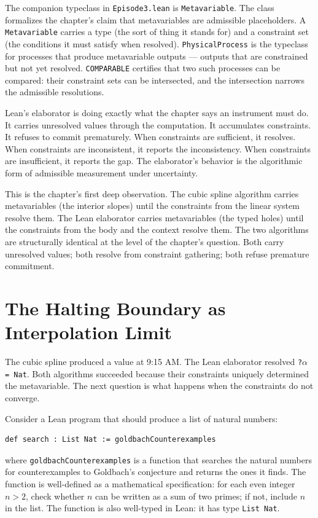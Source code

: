 The companion typeclass in \texttt{Episode3.lean} is
\texttt{Metavariable}. The class formalizes the chapter's claim that
metavariables are admissible placeholders. A \texttt{Metavariable}
carries a type (the sort of thing it stands for) and a constraint set
(the conditions it must satisfy when resolved). \texttt{PhysicalProcess}
is the typeclass for processes that produce metavariable outputs ---
outputs that are constrained but not yet resolved. \texttt{COMPARABLE}
certifies that two such processes can be compared: their constraint
sets can be intersected, and the intersection narrows the admissible
resolutions.

Lean's elaborator is doing exactly what the chapter says an
instrument must do. It carries unresolved values through the
computation. It accumulates constraints. It refuses to commit
prematurely. When constraints are sufficient, it resolves. When
constraints are inconsistent, it reports the inconsistency. When
constraints are insufficient, it reports the gap. The elaborator's
behavior is the algorithmic form of admissible measurement under
uncertainty.

This is the chapter's first deep observation. The cubic spline
algorithm carries metavariables (the interior slopes) until the
constraints from the linear system resolve them. The Lean elaborator
carries metavariables (the typed holes) until the constraints from
the body and the context resolve them. The two algorithms are
structurally identical at the level of the chapter's question. Both
carry unresolved values; both resolve from constraint gathering;
both refuse premature commitment.

\section{The Halting Boundary as Interpolation Limit}
\label{se:halting-boundary-as-interpolation-limit}

The cubic spline produced a value at 9:15 AM. The Lean elaborator
resolved \texttt{?$\alpha$ = Nat}. Both algorithms succeeded because their
constraints uniquely determined the metavariable. The next question is
what happens when the constraints do not converge.

Consider a Lean program that should produce a list of natural numbers:
\begin{verbatim}
def search : List Nat := goldbachCounterexamples
\end{verbatim}
where \texttt{goldbachCounterexamples} is a function that searches the
natural numbers for counterexamples to Goldbach's conjecture and returns
the ones it finds. The function is well-defined as a mathematical
specification: for each even integer $n > 2$, check whether $n$ can be
written as a sum of two primes; if not, include $n$ in the list. The
function is also well-typed in Lean: it has type \texttt{List Nat}.

